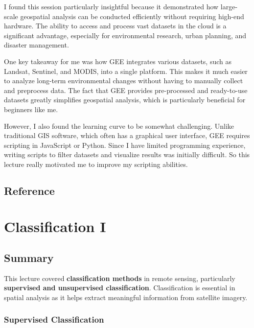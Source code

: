 \documentclass[
  letterpaper,
]{scrbook}
\begin{document}
I found this session particularly insightful because it demonstrated how
large-scale geospatial analysis can be conducted efficiently without
requiring high-end hardware. The ability to access and process vast
datasets in the cloud is a significant advantage, especially for
environmental research, urban planning, and disaster management.

One key takeaway for me was how GEE integrates various datasets, such as
Landsat, Sentinel, and MODIS, into a single platform. This makes it much
easier to analyze long-term environmental changes without having to
manually collect and preprocess data. The fact that GEE provides
pre-processed and ready-to-use datasets greatly simplifies geospatial
analysis, which is particularly beneficial for beginners like me.

However, I also found the learning curve to be somewhat challenging.
Unlike traditional GIS software, which often has a graphical user
interface, GEE requires scripting in JavaScript or Python. Since I have
limited programming experience, writing scripts to filter datasets and
visualize results was initially difficult. So this lecture really
motivated me to improve my scripting abilities.

\section{Reference}\label{reference-3}


\chapter{Classification I}\label{classification-i}

\section{Summary}\label{summary-3}

This lecture covered \textbf{classification methods} in remote sensing,
particularly \textbf{supervised and unsupervised classification}.
Classification is essential in spatial analysis as it helps extract
meaningful information from satellite imagery.

\subsection{\texorpdfstring{\textbf{Supervised
Classification}}{Supervised Classification}}\label{supervised-classification}
\end{document}
